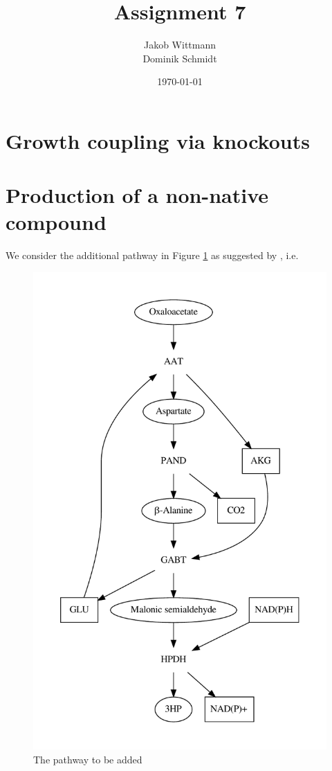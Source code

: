 \documentclass{scrartcl}
\title{Assignment 7}
\author{Jakob Wittmann\\Dominik Schmidt}
\date{\today}
\begin{document}
\maketitle
\section{Growth coupling via knockouts}
\section{Production of a non-native compound}
	We consider the additional pathway in Figure \ref{fig:pathway} as suggested by \cite{BORODINA201557}, i.e. 
	\begin{figure}[h]
		\centering
		\includegraphics[max width=\linewidth, max height=0.5\paperheight]{2/new_pathway.pdf}
		\caption{The pathway to be added}
		\label{fig:pathway}
	\end{figure}
\end{document}
